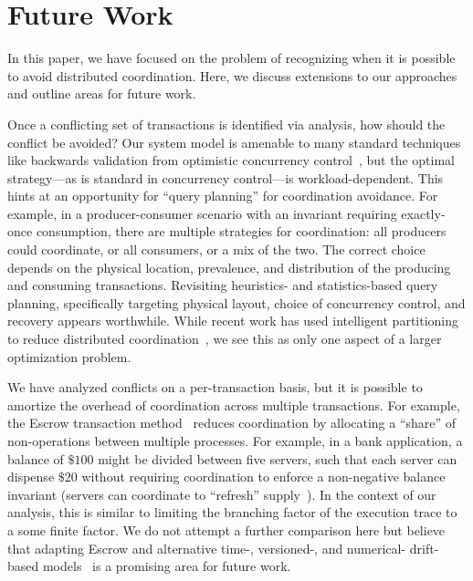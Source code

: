 
\section{Future Work}
\label{sec:discussion}

In this paper, we have focused on the problem of recognizing when it
is possible to avoid distributed coordination. Here, we discuss
extensions to our approaches and outline areas for future work.

 Once a conflicting set of transactions
is identified via \iconfluence analysis, how should the conflict be
avoided? Our system model is amenable to many standard techniques like
backwards validation from optimistic concurrency
control~\cite{bernstein-book,tamer-book}, but the optimal
strategy---as is standard in concurrency control---is
workload-dependent. This hints at an opportunity for ``query
planning'' for coordination avoidance. For example, in a
producer-consumer scenario with an invariant requiring exactly-once
consumption, there are multiple strategies for coordination: all
producers could coordinate, or all consumers, or a mix of the two. The
correct choice depends on the physical location, prevalence, and
distribution of the producing and consuming transactions. Revisiting
heuristics- and statistics-based query planning, specifically
targeting physical layout, choice of concurrency control, and recovery
appears worthwhile. While recent work has used intelligent
partitioning to reduce distributed coordination~\cite{schism}, we see
this as only one aspect of a larger optimization problem.

 We have analyzed conflicts on a
per-transaction basis, but it is possible to amortize the overhead of
coordination across multiple transactions. For example, the Escrow
transaction method~\cite{escrow} reduces coordination by allocating a
``share'' of non-\iconfluent operations between multiple
processes. For example, in a bank application, a balance of $\$100$
might be divided between five servers, such that each server can
dispense $\$20$ without requiring coordination to enforce a
non-negative balance invariant (servers can coordinate to ``refresh''
supply~\cite{mdcc}). In the context of our \cfreedom analysis, this is
similar to limiting the branching factor of the execution trace to a
some finite factor. We do not attempt a further comparison here but
believe that adapting Escrow and alternative time-, versioned-, and
numerical- drift-based models~\cite{yu-conit} is a promising area for
future work.


